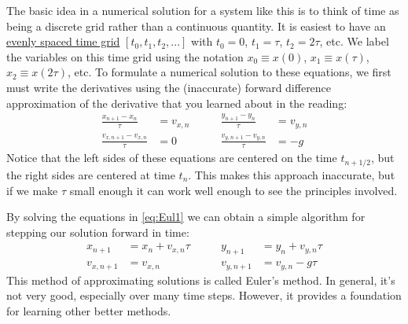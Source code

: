The basic idea in a numerical solution for a system like this is to
think of time as being a discrete grid rather than a continuous
quantity.  It is easiest to have an \ul{evenly spaced time grid} $[t_0,
t_1, t_2, ...]$ with $t_0=0$, $t_1=\tau$, $t_2=2\tau$, etc. We
label the variables on this time grid using the notation $x_0
\equiv x(0)$, $x_1 \equiv x(\tau)$, $x_2 \equiv x(2\tau)$, etc.
To formulate a numerical solution to these equations, we first must
write the derivatives using the (inaccurate) forward
difference approximation of the derivative that you learned about
in the reading:
\begin{equation}\label{eq:Eul1}
    \begin{aligned}
    \frac{x_{n+1} - x_n}{\tau} &= v_{x,n}
    & \qquad
    \frac{y_{n+1} - y_n}{\tau} &= v_{y,n} \\
    \frac{v_{x,n+1} - v_{x,n}}{\tau} &= 0
    & \qquad
    \frac{v_{y,n+1} - v_{y,n}}{\tau}  &= - g
    \end{aligned}
\end{equation}
Notice that the left sides of these equations are centered on the time
$t_{n+1/2}$, but the right sides are centered at time $t_n$. This makes this
approach inaccurate, but if we make $\tau$ small enough it can work well
enough to see the principles involved.

By solving the equations in \eqref{eq:Eul1} we can obtain a simple
algorithm for stepping our solution forward in time:
\begin{equation}\label{eq:Eul2}
    \begin{aligned}
    x_{n+1} &= x_n + v_{x,n} \tau
    & \qquad
    y_{n+1} &= y_n + v_{y,n} \tau \\
    v_{x,n+1} &= v_{x,n}
    & \qquad
    v_{y,n+1} &= v_{y,n}  - g \tau
    \end{aligned}
\end{equation}
This method of approximating
solutions is called Euler's method. In general, it's not very good,
especially over many time steps. However, it provides a foundation for
learning other better methods.

